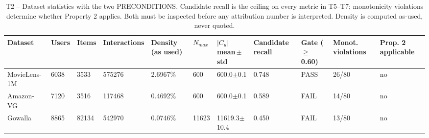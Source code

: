 \begin{table}[htbp]
\centering
\footnotesize
\caption{T2 -- Dataset statistics with the two PRECONDITIONS. Candidate recall is the ceiling on every metric in T5–T7; monotonicity violations determine whether Property 2 applies. Both must be inspected before any attribution number is interpreted. Density is computed as-used, never quoted.}
\label{tab:T2_datasets}
\begin{tabular}{lllllllllll}
\toprule
Dataset & Users & Items & Interactions & Density (as used) & $N_{max}$ & $|C_u|$ mean\,$\pm$\,std & Candidate recall & Gate ($\geq$0.60) & Monot. violations & Prop. 2 applicable \\
\midrule
MovieLens-1M & 6038 & 3533 & 575276 & 2.6967\% & 600 & 600.0$\pm$0.1 & 0.748 & PASS & 26/80 & no \\
Amazon-VG & 7120 & 3516 & 117468 & 0.4692\% & 600 & 600.0$\pm$0.1 & 0.589 & FAIL & 14/80 & no \\
Gowalla & 8865 & 82134 & 542970 & 0.0746\% & 11623 & 11619.3$\pm$10.4 & 0.450 & FAIL & 13/80 & no \\
\bottomrule
\end{tabular}
\end{table}
